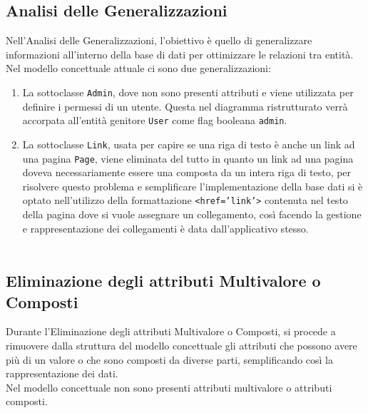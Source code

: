 \documentclass{article}
\begin{document}
	\subsection{Analisi delle Generalizzazioni}
	Nell'Analisi delle Generalizzazioni, l'obiettivo è quello di generalizzare informazioni all'interno della base di dati per ottimizzare le relazioni tra entità.
	\\
	Nel modello concettuale attuale ci sono due generalizzazioni: 
	\\
	
	\begin{enumerate}
	\item 	
		La sottoclasse \texttt{Admin}, dove non sono presenti attributi e viene utilizzata per definire i permessi di un utente. Questa nel diagramma ristrutturato verr\`a accorpata all'entit\`a genitore \texttt{User} come flag booleana \texttt{admin}. 
	\item 
		La sottoclasse \texttt{Link}, usata per capire se una riga di testo è anche un link ad una pagina \texttt{Page}, viene eliminata del tutto in quanto un link ad una pagina doveva necessariamente essere una composta da un intera riga di testo, per risolvere questo problema e semplificare l'implementazione della base dati si è optato nell'utilizzo della formattazione \texttt{<href='link'>} contenuta nel testo della pagina dove si vuole assegnare un collegamento, cos\`i facendo la gestione e rappresentazione dei collegamenti è data dall'applicativo stesso.		
		\\\\
	\end{enumerate}
	
	
	\subsection{Eliminazione degli attributi Multivalore o Composti}
	Durante l'Eliminazione degli attributi Multivalore o Composti, si procede a rimuovere dalla struttura del modello concettuale gli attributi che possono avere più di un valore o che sono composti da diverse parti, semplificando così la rappresentazione dei dati.	
	\\
	Nel modello concettuale non sono presenti attributi multivalore o attributi composti.
	\\\\
	
	\newpage
	
\end{document}
